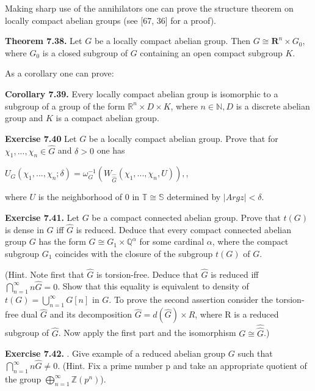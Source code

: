 \documentclass[12pt]{article}
\begin{document}
    Making sharp use of the annihilators one can prove the structure theorem on locally compact abelian groups
(see [67, 36] for a proof).


\textbf{Theorem 7.38.} Let $G$ be a locally compact abelian group. Then $G \cong \textbf{R}^n \times G_0$, where $G_0$ is a closed subgroup
of $G$ containing an open compact subgroup $K$.


    As a corollary one can prove:


\textbf{Corollary 7.39.} Every locally compact abelian group is isomorphic to a subgroup of a group of the form
$\mathbb{R}^n \times D \times K$, where $n \in \mathbb{N}, D$ is a discrete abelian group and $K$ is a compact abelian group.


\textbf{Exercise 7.40} Let $G$ be a locally compact abelian group. Prove that for $\chi_1, . . . , \chi_n \in \hat{G}$ and $\delta > 0$ one has


    $U_G (\chi_1, . . . , \chi_n; \delta) = \omega^{-1}_G (W_{\hat{\hat{G}}} ({\chi_1, . . . , \chi_n}, U)),$,


where $U$ is the neighborhood of 0 in $\mathbb{T} \cong \mathbb{S}$ determined by $|Argz| < \delta$.


\textbf{Exercise 7.41.} Let $G$ be a compact connected abelian group. Prove that $t(G)$ is dense in $G$ iff $\hat{G}$ is reduced.
Deduce that every compact connected abelian group $G$ has the form $G \cong G_1 \times \mathbb{Q}^\alpha$ for some cardinal $\alpha$, where
the compact subgroup $G_1$ coincides with the closure of the subgroup $t(G)$ of $G$.


(Hint. Note first that $\hat{G}$ is torsion-free. Deduce that $\hat{G}$ is reduced iff $\bigcap^{\infty}_{n=1} n \hat{G} = 0$. Show that this equality
is equivalent to density of $t(G) = \bigcup^{\infty}_{n=1} G[n]$ in $G$. To prove the second assertion consider the torsion-free dual
$\hat{G}$ and its decomposition $\hat{G} = d(\hat{G}) \times R$, where R is a reduced subgroup of $\hat{G}$. Now apply the first part and the
isomorphism $G \cong \hat{\hat{G}}$.)


\textbf{Exercise 7.42.} . Give example of a reduced abelian group $G$ such that $\bigcap^{\infty}_{n=1} n \hat{G} \neq 0$.
(Hint. Fix a prime number p and take an appropriate quotient of the group $\bigoplus^{\infty}_{n=1} \mathbb{Z}(p^n)$).
\end{document}
